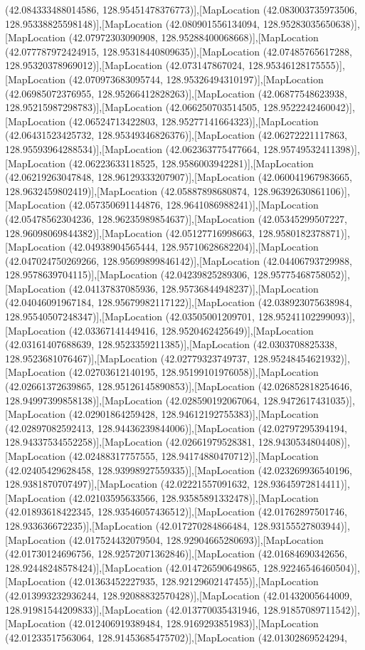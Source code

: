 (42.084333488014586, 128.95451478376773)],[MapLocation (42.083003735973506, 128.95338825598148)],[MapLocation (42.080901556134094, 128.95283035650638)],[MapLocation (42.07972303090908, 128.95288400068668)],[MapLocation (42.077787972424915, 128.95318440809635)],[MapLocation (42.07485765617288, 128.95320378969012)],[MapLocation (42.073147867024, 128.95346128175555)],[MapLocation (42.070973683095744, 128.95326494310197)],[MapLocation (42.06985072376955, 128.95266412828263)],[MapLocation (42.06877548623938, 128.95215987298783)],[MapLocation (42.066250703514505, 128.9522242460042)],[MapLocation (42.06524713422803, 128.95277141664323)],[MapLocation (42.06431523425732, 128.95349346826376)],[MapLocation (42.06272221117863, 128.95593964288534)],[MapLocation (42.062363775477664, 128.95749532411398)],[MapLocation (42.06223633118525, 128.9586003942281)],[MapLocation (42.06219263047848, 128.96129333207907)],[MapLocation (42.060041967983665, 128.9632459802419)],[MapLocation (42.05887898680874, 128.96392630861106)],[MapLocation (42.057350691144876, 128.9641086988241)],[MapLocation (42.05478562304236, 128.96235989854637)],[MapLocation (42.05345299507227, 128.96098069844382)],[MapLocation (42.05127716998663, 128.9580182378871)],[MapLocation (42.04938904565444, 128.95710628682204)],[MapLocation (42.047024750269266, 128.95699899846142)],[MapLocation (42.04406793729988, 128.9578639704115)],[MapLocation (42.04239825289306, 128.95775468758052)],[MapLocation (42.04137837085936, 128.95736844948237)],[MapLocation (42.04046091967184, 128.95679982117122)],[MapLocation (42.038923075638984, 128.95540507248347)],[MapLocation (42.03505001209701, 128.95241102299093)],[MapLocation (42.03367141449416, 128.9520462425649)],[MapLocation (42.03161407688639, 128.9523359211385)],[MapLocation (42.0303708825338, 128.9523681076467)],[MapLocation (42.02779323749737, 128.95248454621932)],[MapLocation (42.02703612140195, 128.95199101976058)],[MapLocation (42.02661372639865, 128.95126145890853)],[MapLocation (42.026852818254646, 128.94997399858138)],[MapLocation (42.028590192067064, 128.9472617431035)],[MapLocation (42.02901864259428, 128.94612192755383)],[MapLocation (42.02897082592413, 128.94436239844006)],[MapLocation (42.02797295394194, 128.94337534552258)],[MapLocation (42.02661979528381, 128.9430534804408)],[MapLocation (42.02488317757555, 128.94174880470712)],[MapLocation (42.02405429628458, 128.93998927559335)],[MapLocation (42.023269936540196, 128.9381870707497)],[MapLocation (42.02221557091632, 128.93645972814411)],[MapLocation (42.02103595633566, 128.93585891332478)],[MapLocation (42.01893618422345, 128.93546057436512)],[MapLocation (42.01762897501746, 128.933636672235)],[MapLocation (42.017270284866484, 128.93155527803944)],[MapLocation (42.017524432079504, 128.92904665280693)],[MapLocation (42.01730124696756, 128.92572071362846)],[MapLocation (42.01684690342656, 128.92448248578424)],[MapLocation (42.014726590649865, 128.92246546460504)],[MapLocation (42.01363452227935, 128.92129602147455)],[MapLocation (42.013993232936244, 128.92088832570428)],[MapLocation (42.01432005644009, 128.91981544209833)],[MapLocation (42.013770035431946, 128.91857089711542)],[MapLocation (42.012406919389484, 128.9169293851983)],[MapLocation (42.01233517563064, 128.91453685475702)],[MapLocation (42.01302869524294, 